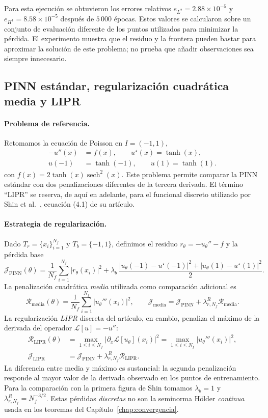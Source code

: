 Para esta ejecución se obtuvieron los errores relativos $e_{L^2}=2.88\times10^{-5}$ y $e_{H^1}=8.58\times10^{-5}$ después de $5\,000$ épocas. Estos valores se calcularon sobre un conjunto de evaluación diferente de los puntos utilizados para minimizar la pérdida. El experimento muestra que el residuo y la frontera pueden bastar para aproximar la solución de este problema; no prueba que añadir observaciones sea siempre innecesario.

\subsection{PINN estándar, regularización cuadrática media y LIPR}
\label{subsec:regularizacion_1d}

\paragraph{Problema de referencia.}
Retomamos la ecuación de Poisson en $I=(-1,1)$,
\[
\begin{aligned}
-u''(x)&=f(x),\qquad u^\star(x)=\tanh(x),\\
u(-1)&=\tanh(-1),\qquad u(1)=\tanh(1).
\end{aligned}
\]
con $f(x)=2\tanh(x)\operatorname{sech}^2(x)$. Este problema permite comparar la PINN estándar con dos penalizaciones diferentes de la tercera derivada. El término ``LIPR'' se reserva, de aquí en adelante, para el funcional discreto utilizado por Shin et al.~\cite{shin2020convergence}, ecuación (4.1) de su artículo.

\paragraph{Estrategia de regularización.}
Dado $T_r=\{x_i\}_{i=1}^{N_f}$ y $T_b=\{-1,1\}$, definimos el residuo
$r_\theta=-u_\theta''-f$ y la pérdida base
\[
\mathcal J_{\mathrm{PINN}}(\theta)
=\frac1{N_f}\sum_{i=1}^{N_f}|r_\theta(x_i)|^2
+\lambda_b\,\frac{|u_\theta(-1)-u^\star(-1)|^2+|u_\theta(1)-u^\star(1)|^2}{2}.
\]
La penalización cuadrática \emph{media} utilizada como comparación adicional es
\[
\mathcal R_{\mathrm{media}}(\theta)
=\frac1{N_f}\sum_{i=1}^{N_f}|u_\theta'''(x_i)|^2,
\qquad
\mathcal J_{\mathrm{media}}=\mathcal J_{\mathrm{PINN}}
+\lambda_{r,N_f}^{R}\mathcal R_{\mathrm{media}}.
\]
La regularización \emph{LIPR} discreta del artículo, en cambio, penaliza el máximo de la derivada del operador $\mathcal L[u]=-u''$:
\begin{align*}
\mathcal R_{\mathrm{LIPR}}(\theta)
&=\max_{1\leq i\leq N_f}|\partial_x\mathcal L[u_\theta](x_i)|^2
=\max_{1\leq i\leq N_f}|u_\theta'''(x_i)|^2,\\
\mathcal J_{\mathrm{LIPR}}
&=\mathcal J_{\mathrm{PINN}}+\lambda_{r,N_f}^{R}\mathcal R_{\mathrm{LIPR}}.
\end{align*}
La diferencia entre media y máximo es sustancial: la segunda penalización responde al mayor valor de la derivada observado en los puntos de entrenamiento. Para la comparación con la primera figura de Shin tomamos $\lambda_b=1$ y $\lambda_{r,N_f}^{R}=N_f^{-3/2}$. Estas pérdidas \emph{discretas} no son la seminorma H\"older \emph{continua} usada en los teoremas del Capítulo~\ref{chap:convergencia}.


